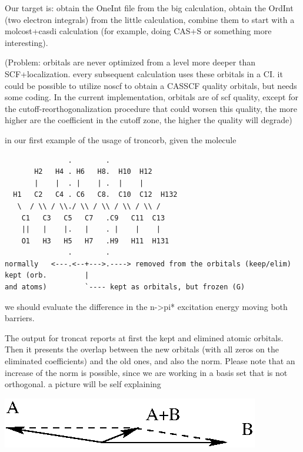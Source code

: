 \documentclass[a4paper,11pt]{report}
\begin{document}
Our target is: obtain the OneInt file from the big calculation, obtain the
OrdInt (two electron integrals) from the little calculation, combine them to
start with a molcost+casdi calculation (for example, doing CAS+S or
something more interesting).

(Problem: orbitals are never optimized from a level more deeper than
SCF+localization. every subsequent calculation uses these orbitals in a CI.
it could be possible to utilize noscf to obtain a CASSCF quality orbitals,
but needs some coding. In the current implementation, orbitals are of scf
quality, except for the cutoff-reorthogonalization procedure that could
worsen this quality, the more higher are the coefficient in the cutoff zone,
the higher the quality will degrade)

in our first example of the usage of troncorb, given the molecule

\begin{verbatim}
               .        .  
       H2   H4 . H6   H8.  H10  H12
       |    |  . |    | .  |    |   
  H1   C2   C4 . C6   C8.  C10  C12  H132
   \  / \\ / \\./ \\ / \\ / \\ / \\ /
    C1   C3   C5   C7   .C9   C11  C13
    ||   |    |.   |    . |    |    |
    O1   H3   H5   H7   .H9   H11  H131
               .        .
normally   <---.<--+--->.----> removed from the orbitals (keep/elim)
kept (orb.         |
and atoms)         `---- kept as orbitals, but frozen (G)
\end{verbatim}           

we should evaluate the difference in the n->pi* excitation energy moving
both barriers.

The output for troncat reports at first the kept and elimined atomic orbitals.
Then it presents the overlap between the new orbitals (with all zeros on the
eliminated coefficients) and the old ones, and also the norm. Please note
that an increase of the norm is possible, since we are working in a basis
set that is not orthogonal. a picture will be self explaining

\begin{center}
\includegraphics{vectors.eps}
\end{center}
\end{document}

